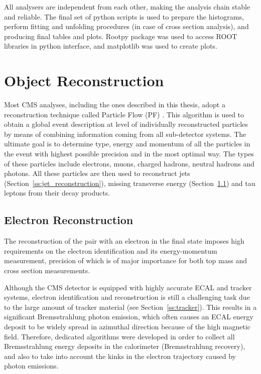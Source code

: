 All analysers are independent from each other, making the analysis chain stable and reliable. The final set of python
scripts is used to prepare the histograms, perform fitting and unfolding procedures (in case of cross section analysis),
and producing final tables and plots. Rootpy package \autocite{rootpy} was used to access ROOT libraries in python
interface, and matplotlib \autocite{matplotlib} was used to create plots.

\section{Object Reconstruction}
\label{s:object_reconstruction}
Most CMS analyses, including the ones described in this thesis, adopt a reconstruction technique called Particle Flow
(PF) \autocite{PF}. This algorithm is used to obtain a global event description at level of individually reconstructed
particles by means of combining information coming from all sub-detector systems. The ultimate goal is to determine
type, energy and momentum of all the particles in the event with highest possible precision and in the most optimal way.
The types of these particles include electrons, muons, charged hadrons, neutral hadrons and photons. All these particles
are then used to reconstruct jets (Section~\ref{ss:jet_reconstruction}), missing transverse energy
(Section~\ref{ss:electron_reconstruction}) and tau leptons from their decay products.

\subsection{Electron Reconstruction}
\label{ss:electron_reconstruction}
The reconstruction of the \ttbar pair with an electron in the final state imposes high requirements on the electron
identification and its energy-momentum measurement, precision of which is of major importance for both top mass and
\ttbar cross section measurements.

Although the CMS detector is equipped with highly accurate ECAL and tracker systems, electron identification and
reconstruction is still a challenging task due to the large amount of tracker material (see Section~\ref{ss:tracker}).
This results in a significant Bremsstrahlung photon emission, which often causes an ECAL energy deposit to be widely
spread in azimuthal direction because of the high magnetic field. Therefore, dedicated algorithms were developed in
order to collect all Bremsstrahlung energy deposits in the calorimeter (Bremsstrahlung recovery), and also to take into
account the kinks in the electron trajectory caused by photon emissions.

